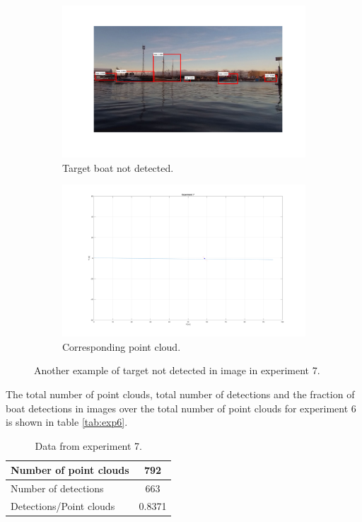 \begin{figure}[H]
	\centering
	\begin{subfigure}[t]{.5\linewidth}
		\centering
		\includegraphics[width=\linewidth]{fig/ex7_miss_top.png}
		\caption{Target boat not detected.}
		\label{fig:sub_ex7_issue3}
	\end{subfigure}%
	\begin{subfigure}[t]{.5\linewidth}
		\centering
		\includegraphics[width=\linewidth]{fig/ex7_miss_top_pc.png}
		\caption{Corresponding point cloud.}
		\label{fig:sub_ex7_issue4}
	\end{subfigure}
	\caption{Another example of target not detected in image in experiment 7.}
	\label{fig:issues_ex7_2}
\end{figure}
The total number of point clouds, total number of detections and the fraction of boat detections in images over the total number of point clouds for experiment 6 is shown in table \ref{tab:exp6}.
\begin{table}[H]
	\centering
	\begin{tabularx}{.7\linewidth}{L c}
		\toprule
		Number of point clouds & 792\\
		\midrule
		Number of detections & 663\\
		\midrule
		Detections/Point clouds & 0.8371 \\
		\bottomrule
	\end{tabularx}
	\caption{Data from experiment 7.}
	\label{tab:exp7}
\end{table}
